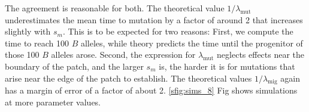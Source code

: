 \documentclass{article}
\newcommand{\migrate}{\lambda_\text{mig}}
\newcommand{\mutrate}{\lambda_\text{mut}}
\begin{document}
The agreement is reasonable for both.
The theoretical value $1/\mutrate$ underestimates the mean time to mutation
by a factor of around 2 that increases slightly with $s_m$.
This is to be expected for two reasons:
First, we compute the time to reach 100 $B$ alleles, while theory predicts
the time until the progenitor of those 100 $B$ alleles arose.
Second, the expression for $\mutrate$ neglects effects near the boundary of the patch,
and the larger $s_m$ is, 
the harder it is for mutations that arise near the edge of the patch to establish.
The theoretical values $1/\migrate$ again has a margin of error of a factor of about 2.
\ref{sfig:sims_8} Fig shows simulations at more parameter values.
\end{document}
